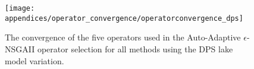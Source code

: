 \begin{figure}[ht]
    \centering
    \captionsetup{width=0.85\textwidth}
    
    \texttt{[image: appendices/operator\_convergence/operatorconvergence\_dps]}
    \caption[Operator convergence for the DPS model variation]{The convergence of the five operators used in the Auto-Adaptive $\epsilon$-NSGAII operator selection for all methods using the DPS lake model variation.}
    \label{fig:operatorconvergence-dps}
\end{figure}